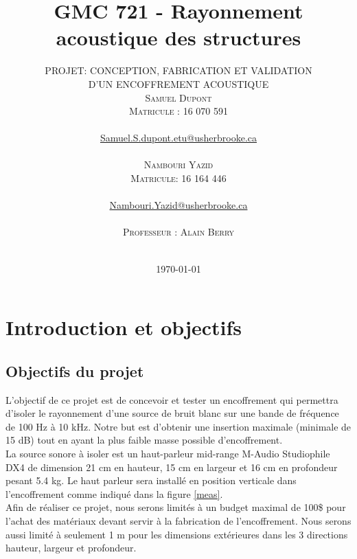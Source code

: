 \documentclass[12pt,foolscap]{report}
\title{GMC 721 - Rayonnement acoustique des structures}
\author{%
	\textsc{PROJET: CONCEPTION, FABRICATION ET VALIDATION }\\
	\textsc{D'UN ENCOFFREMENT ACOUSTIQUE} \\
	\textsc{Samuel Dupont  }\\ %
	\textsc{Matricule : 16 070 591}\\ \\
	\normalsize \href{mailto:Samuel.S.dupont.etu@usherbrooke.ca}{Samuel.S.dupont.etu@usherbrooke.ca} \\ \\
	\textsc{Nambouri Yazid  }\\ %
	\textsc{Matricule: 16 164 446}\\ \\
	\normalsize \href{mailto:Nambouri.Yazid@usherbrooke.ca}{Nambouri.Yazid@usherbrooke.ca}\\ \\
	\textsc{Professeur : Alain Berry}\\ \\
}
\date{\today \\ }
\begin{document}
	\maketitle
	
	
	\chapter{Introduction et objectifs}
	\label{ch:objectif}
	
	\section{Objectifs du projet}
	L'objectif de ce projet est de concevoir et tester un encoffrement qui 
	permettra d'isoler le rayonnement d'une source de bruit blanc sur une 
	bande de fréquence de 100 Hz à 10 kHz. Notre but est d'obtenir une 
	insertion maximale (minimale de 15 dB) tout en ayant la plus faible masse possible d'encoffrement. \\
	
	La source sonore à isoler est un haut-parleur mid-range M-Audio Studiophile DX4 de dimension 21 cm en hauteur, 15 cm en largeur et 16 cm en profondeur pesant 5.4 kg. Le haut parleur sera installé en position verticale dans l'encoffrement comme indiqué dans la figure \ref{meas}. \\
	
	Afin de réaliser ce projet, nous serons limités à un budget maximal de 100\$ pour l'achat des matériaux devant servir à la fabrication de l'encoffrement. Nous serons aussi limité à seulement 1 m pour les dimensions extérieures dans les 3 directions hauteur, largeur et profondeur.
	
\end{document}
